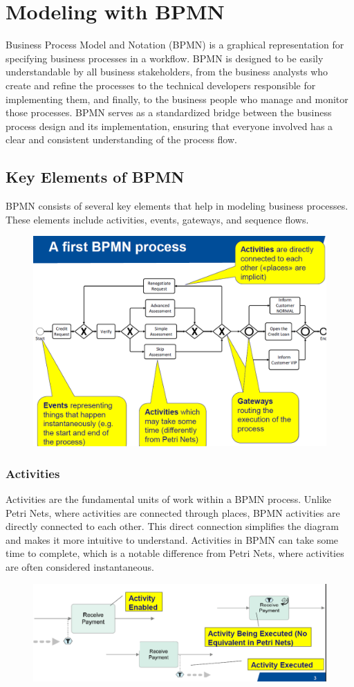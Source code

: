 \chapter{Modeling with BPMN}

Business Process Model and Notation (BPMN) is a graphical representation for specifying business processes in a workflow. BPMN is designed to be easily understandable by all business stakeholders, from the business analysts who create and refine the processes to the technical developers responsible for implementing them, and finally, to the business people who manage and monitor those processes. BPMN serves as a standardized bridge between the business process design and its implementation, ensuring that everyone involved has a clear and consistent understanding of the process flow.

\section{Key Elements of BPMN}

BPMN consists of several key elements that help in modeling business processes. These elements include activities, events, gateways, and sequence flows.
\begin{figure}[h!]
    \centering
    \includegraphics[width=0.75\linewidth]{capitolo 9/1.png}
\end{figure}

\subsection{Activities}

Activities are the fundamental units of work within a BPMN process. Unlike Petri Nets, where activities are connected through places, BPMN activities are directly connected to each other. This direct connection simplifies the diagram and makes it more intuitive to understand. Activities in BPMN can take some time to complete, which is a notable difference from Petri Nets, where activities are often considered instantaneous.
\begin{figure}[h!]
    \centering
    \includegraphics[width=0.75\linewidth]{capitolo 9/2.png}
\end{figure}
